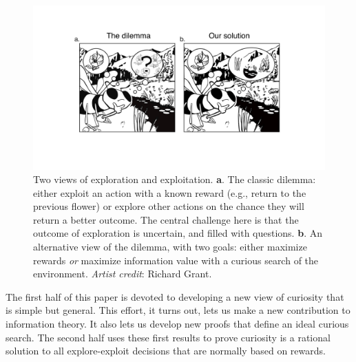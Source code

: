 \begin{figure}
	\begin{fullwidth}
	\includegraphics[width=.55\linewidth]{dilemma-draft-elife/img/bee.pdf} 
	\caption{Two views of exploration and exploitation. \textbf{a}. The classic dilemma: either exploit an action with a known reward (e.g., return to the previous flower) or explore other actions on the chance they will return a better outcome. The central challenge here is that the outcome of exploration is uncertain, and filled with questions. \textbf{b}. An alternative view of the dilemma, with two goals: either maximize rewards \textit{or} maximize information value with a curious search of the environment. \textit{Artist credit}: Richard Grant.}
	\label{fig:bee} 
	\end{fullwidth}
\end{figure}

The first half of this paper is devoted to developing a new view of curiosity that is simple but general. This effort, it turns out, lets us make a new contribution to information theory. It also lets us develop new proofs that define an ideal curious search. The second half uses these first results to prove curiosity is a rational solution to all explore-exploit decisions that are normally based on rewards.



